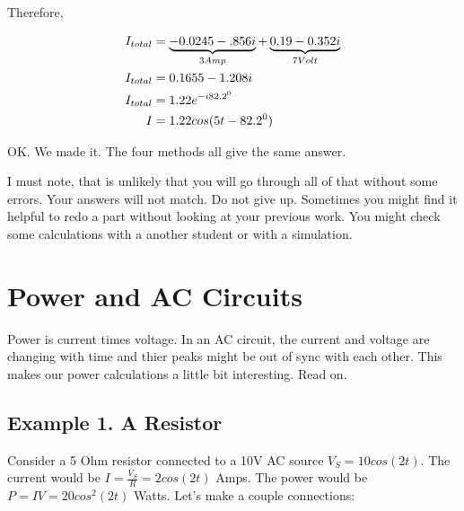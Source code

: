 Therefore,

\begin{align}
I_{total} &=\underbrace{-0.0245-.856i}_{3 Amp}+\underbrace{0.19-0.352i}_{7 Volt}\\
I_{total} &=0.1655-1.208i\\
I_{total} &=1.22e^{-i82.2^0}\notag\\
I &= 1.22cos(5t-82.2^0)
\end{align}

OK. We made it. The four methods all give the same answer. \par

I must note, that is unlikely that you will go through all of that without some errors. Your answers will not match. Do not give up. Sometimes you might find it helpful to redo a part without looking at your previous work. You might check some calculations with a another student or with a simulation. 

\section{Power and AC Circuits}
Power is current times voltage. In an AC circuit, the current and voltage are changing with time and thier peaks might be out of sync with each other. This makes our power calculations a little bit interesting. Read on.\par

\subsection{Example 1. A Resistor}
Consider a 5 Ohm resistor connected to a 10V AC source $V_S=10cos(2t)$. The current would be $I=\frac{V_S}{R}=2cos(2t)$ Amps. The power would be $P=IV=20cos^2(2t) $ Watts. Let's make a couple connections:

